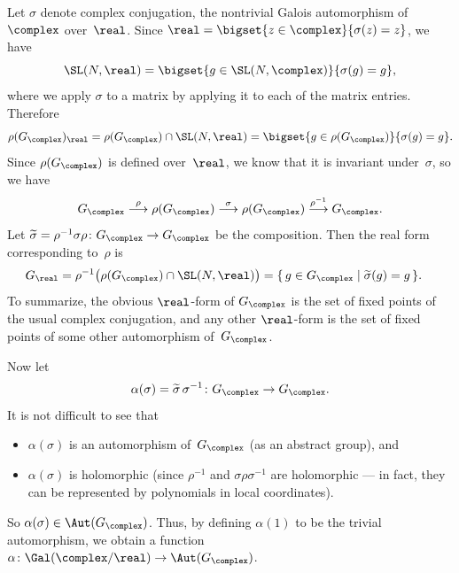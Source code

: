 Let $\sigma$ denote complex conjugation, the nontrivial Galois automorphism of~$\complex$ over~$\real$. Since
	$ \real = \bigset{ z \in \complex }{ \sigma(z) = z } $,
we have
	$$ \SL(N,\real) = \bigset{ g \in \SL(N,\complex) }{ \sigma(g) = g } ,$$
where we apply $\sigma$ to a matrix by applying it to each of the matrix entries. Therefore
	$$ \rho(G_{\complex})_\real 
	= \rho(G_{\complex}) \cap \SL(N,\real)
	= \bigset{ g \in \rho(G_{\complex}) }{ \sigma(g) = g} .$$
Since $\rho(G_{\complex})$ is defined over~$\real$, we know that it is invariant under~$\sigma$, so we have
	$$ %
	 G_{\complex} \stackrel{\rho}{\longrightarrow}
	  \rho(G_\complex) \stackrel{\sigma}{\longrightarrow}
	   \rho(G_\complex) \stackrel{\rho^{-1}}{\longrightarrow}
	    G_{\complex} .$$
Let $\widetilde\sigma = \rho^{-1} \sigma \rho \colon G_{\complex} \to G_{\complex}$ be the composition. 
Then the real form corresponding to~$\rho$ is
	\begin{align*}
	G_{\real} &= \rho^{-1} \bigl( \rho (G_{\complex}) \cap \SL(N,\real) \bigr)  
	= \{\, g \in G_{\complex} \mid \widetilde\sigma(g) = g  \,\} 
	. \end{align*}
To summarize, the obvious $\real$-form of $G_{\complex}$ is the set of fixed points of the usual complex conjugation, and any other $\real$-form is the set of fixed points of some other automorphism of~$G_\complex$.

Now let
	\begin{align} \label{CocAlphaRFormDefn}
	 \alpha(\sigma) = \widetilde\sigma \, \sigma^{-1} \colon G_{\complex} \to G_{\complex} 
	 . \end{align}
It is not difficult to see that 
	\begin{itemize}
	\item $\alpha(\sigma)$ is an automorphism of~$G_{\complex}$ (as an abstract group),
	and
	\item $\alpha(\sigma)$ is holomorphic (since $\rho^{-1}$ and $\sigma \rho \sigma^{-1}$ are holomorphic --- in fact, they can be represented by polynomials in local coordinates).
	\end{itemize}
So $\alpha(\sigma) \in \Aut (G_{\complex})$. Thus, by defining $\alpha(1)$ to be the trivial automorphism, we obtain a function $\alpha \colon \Gal(\complex/\real) \to \Aut ( G_{\complex} )$.


